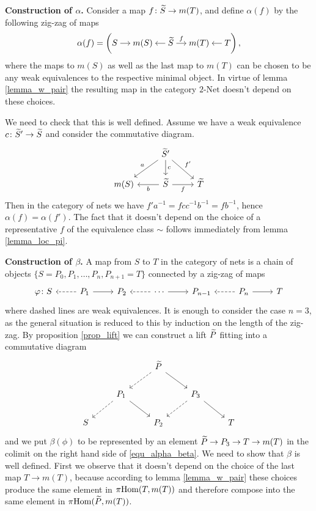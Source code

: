 \documentclass[letterpaper,12pt,leqno]{article}
\numberwithin{equation}{theorem}
\def\Net{\textrm{-}\mathrm{Net}}
\begin{document}
{\bf Construction of $\alpha$.} Consider a map $f\colon \widetilde S \to m(T)$, and define $\alpha(f)$ by the following zig-zag of maps
$$
\alpha(f) = \left(\begin{tikzcd}[cramped,sep=small]
S \ar[r] & m(S) & \wtilde S \ar[l] \ar[r, "f"] & m(T) & T \ar[l]
\end{tikzcd}\right),
$$
where the maps to $m(S)$ as well as the last map to $m(T)$ can be chosen to be any weak equivalences to the respective minimal object.
In virtue of lemma \ref{lemma_w_pair} the resulting map in the category $2\Net$ doesn't depend on these choices.

We need to check that this is well defined. Assume we have a weak equivalence $c\colon\widetilde S' \to \widetilde S$ and consider the commutative diagram.
$$
\begin{tikzcd}
& \wtilde S' \ar[d, "c"] \ar[dl, "a"'] \ar[dr, "f'"] & \\
m(S) & \wtilde S \ar[l, "b"] \ar[r, "f"']  & \wtilde T
\end{tikzcd}
$$
Then in the category of nets we have $f' a^{-1} = f c c^{-1} b^{-1} = f b^{-1}$, hence $\alpha(f) = \alpha(f')$. The fact that it doesn't depend on the choice of a representative $f$
of the equivalence class $\sim$ follows immediately from lemma \ref{lemma_loc_pi}.

{\bf Construction of $\beta$.} A map from $S$ to $T$ in the category of nets is a chain of objects $\{S = P_0, P_1, \ldots, P_n, P_{n+1} = T\}$ connected by a zig-zag of maps
$$
\begin{tikzcd}
\phi\from S & P_1 \ar[dashed, l] \ar[r] & P_2 & \cdots \ar[dashed, l] \ar[r] & P_{n-1} & P_n \ar[dashed, l] \ar[r] & T
\end{tikzcd}
$$
where dashed lines are weak equivalences. It is enough to consider the case $n = 3$, as the general situation is reduced to this by induction on the length of the zig-zag.
By proposition \ref{prop_lift} we can construct a lift $\widetilde P$ fitting into a commutative diagram
$$
\begin{tikzcd}
&& \wtilde P \ar[dashed, dl] \ar[dr] && \\
& P_1 \ar[dashed, dl] \ar[dr] && P_3 \ar[dashed, dl] \ar[dr] & \\
S && P_2 && T
\end{tikzcd}
$$
and we put $\beta(\phi)$ to be represented by an element $\widetilde P \to P_3 \to T \to m(T)$ in the colimit on the right hand side of \ref{equ_alpha_beta}.
We need to show that $\beta$ is well defined. First we observe that it doesn't depend on the choice of the last map $T \to m(T)$, because according to
lemma \ref{lemma_w_pair} these choices produce the same element in $\pi\mathrm{Hom}(T, m(T))$ and therefore compose into the same element in $\pi\mathrm{Hom}(\widetilde P, m(T))$.
\end{document}

